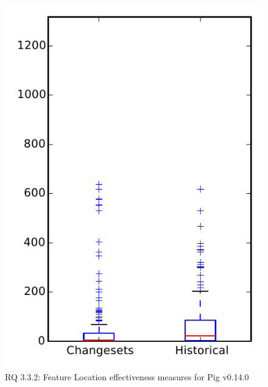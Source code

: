 
\begin{figure}
\centering
\includegraphics[height=0.4\textheight]{figures/flt/rq2_pig}
\caption{RQ 3.3.2: Feature Location effectiveness measures for Pig v0.14.0}
\label{fig:flt:rq2:pig}
\end{figure}

